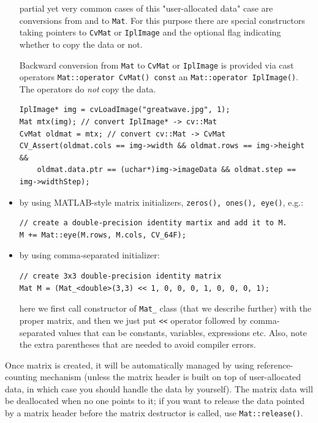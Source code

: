 \begin{itemize}
        partial yet very common cases of this "user-allocated data" case are conversions
        from  and  to \texttt{Mat}. For this purpose there are special constructors
        taking pointers to \texttt{CvMat} or \texttt{IplImage} and the optional
        flag indicating whether to copy the data or not.
        
        Backward conversion from \texttt{Mat} to \texttt{CvMat} or \texttt{IplImage} is provided via cast operators
        \texttt{Mat::operator CvMat() const} an \texttt{Mat::operator IplImage()}.
        The operators do \emph{not} copy the data.
        
\begin{lstlisting}
IplImage* img = cvLoadImage("greatwave.jpg", 1);
Mat mtx(img); // convert IplImage* -> cv::Mat
CvMat oldmat = mtx; // convert cv::Mat -> CvMat
CV_Assert(oldmat.cols == img->width && oldmat.rows == img->height &&
    oldmat.data.ptr == (uchar*)img->imageData && oldmat.step == img->widthStep);
\end{lstlisting}
        
\item by using MATLAB-style matrix initializers, \texttt{zeros(), ones(), eye()}, e.g.:

\begin{lstlisting}
// create a double-precision identity martix and add it to M.
M += Mat::eye(M.rows, M.cols, CV_64F);
\end{lstlisting}

\item by using comma-separated initializer:
\begin{lstlisting}
// create 3x3 double-precision identity matrix
Mat M = (Mat_<double>(3,3) << 1, 0, 0, 0, 1, 0, 0, 0, 1);
\end{lstlisting}

here we first call constructor of \texttt{Mat\_} class (that we describe further) with the proper matrix, and then we just put \texttt{<<} operator followed by comma-separated values that can be constants, variables, expressions etc. Also, note the extra parentheses that are needed to avoid compiler errors.
        
\end{itemize}

Once matrix is created, it will be automatically managed by using reference-counting mechanism (unless the matrix header is built on top of user-allocated data, in which case you should handle the data by yourself).
The matrix data will be deallocated when no one points to it; if you want to release the data pointed by a matrix header before the matrix destructor is called, use \texttt{Mat::release()}.

